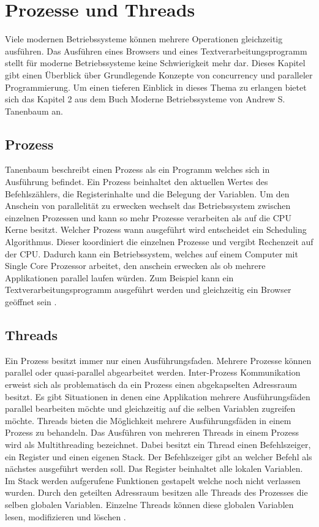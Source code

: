 \section{Prozesse und Threads}

Viele modernen Betriebssysteme können mehrere Operationen gleichzeitig ausführen. Das Ausführen eines Browsers und eines Textverarbeitungsprogramm stellt für moderne Betriebssysteme keine Schwierigkeit mehr dar. Dieses Kapitel gibt einen Überblick über Grundlegende Konzepte von concurrency und paralleler Programmierung. Um einen tieferen Einblick in dieses Thema zu erlangen bietet sich das Kapitel 2 aus dem Buch Moderne Betriebssysteme von Andrew S. Tanenbaum an. 

\subsection{Prozess}
\label{section: Prozess}
Tanenbaum beschreibt einen Prozess als ein Programm welches sich in Ausführung befindet. Ein Prozess beinhaltet den aktuellen Wertes des Befehlszählers, die Registerinhalte und die Belegung der Variablen. Um den Anschein von parallelität zu erwecken wechselt das Betriebssystem zwischen einzelnen Prozessen und kann so mehr Prozesse verarbeiten als auf die CPU Kerne besitzt. Welcher Prozess wann ausgeführt wird entscheidet ein Scheduling Algorithmus. Dieser koordiniert die einzelnen Prozesse und vergibt Rechenzeit auf der CPU. Dadurch kann ein Betriebssystem, welches auf einem Computer mit Single Core Prozessor arbeitet, den anschein erwecken als ob mehrere Applikationen parallel laufen würden. Zum Beispiel kann ein Textverarbeitungsprogramm ausgeführt werden und gleichzeitig ein Browser geöffnet sein \cite[p. 87]{tan09}.

\subsection{Threads}
\label{section: Threads}
Ein Prozess besitzt immer nur einen Ausführungsfaden. Mehrere Prozesse können parallel oder quasi-parallel abgearbeitet werden. Inter-Prozess Kommunikation erweist sich als problematisch da ein Prozess einen abgekapselten Adressraum besitzt. Es gibt Situationen in denen eine Applikation mehrere Ausführungsfäden parallel bearbeiten möchte und gleichzeitig auf die selben Variablen zugreifen möchte. Threads bieten die Möglichkeit mehrere Ausführungsfäden in einem Prozess zu behandeln. Das Ausführen von mehreren Threads in einem Prozess wird als Multithreading bezeichnet. Dabei besitzt ein Thread einen Befehlszeiger, ein Register und einen eigenen Stack. Der Befehlszeiger gibt an welcher Befehl als nächstes ausgeführt werden soll. Das Register beinhaltet alle lokalen Variablen. Im Stack werden aufgerufene Funktionen gestapelt welche noch nicht verlassen wurden. Durch den geteilten Adressraum besitzen alle Threads des Prozesses die selben globalen Variablen. Einzelne Threads können diese globalen Variablen lesen, modifizieren und löschen \cite[p. 97]{tan09}. 

